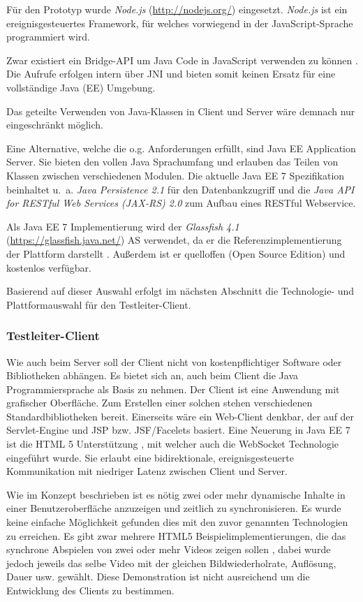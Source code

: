 Für den Prototyp wurde \emph{Node.js} (\url{http://nodejs.org/}) eingesetzt.
\emph{Node.js} ist ein ereignisgesteuertes Framework, für welches vorwiegend in der JavaScript-Sprache \cite[vgl.][]{Joyent.2014} programmiert wird.

Zwar existiert ein Bridge-\ac{API} um Java Code in JavaScript verwenden zu können .
Die Aufrufe erfolgen intern über \ac{JNI} und bieten somit keinen Ersatz für eine vollständige Java (EE) Umgebung. \cite[Vgl.][]{Ferner.2014}

Das geteilte Verwenden von Java-Klassen in Client und Server wäre demnach nur eingeschränkt möglich.

Eine Alternative, welche die o.g. Anforderungen erfüllt, sind Java EE Application Server.
Sie bieten den vollen Java Sprachumfang und erlauben das Teilen von Klassen zwischen verschiedenen Modulen.
Die aktuelle Java EE 7 Spezifikation beinhaltet u.~a. \emph{Java Persistence 2.1} für den Datenbankzugriff und die \emph{Java API for RESTful Web Services (JAX-RS) 2.0} zum Aufbau eines RESTful Webservice.
\cite[Vgl.][]{Oracle.2014}

Als Java EE 7 Implementierung wird der \emph{Glassfish 4.1} (\url{https://glassfish.java.net/})
\ac{AS} verwendet, da er die Referenzimplementierung der Plattform darstellt \cite[vgl.][14]{OracleCorporation.2013b}.
Außerdem ist er quelloffen (Open Source Edition) und kostenlos verfügbar.

Basierend auf dieser Auswahl erfolgt im nächsten Abschnitt die Technologie- und Plattformauswahl für den Testleiter-Client. 

\subsubsection{Testleiter-Client}
Wie auch beim Server soll der Client nicht von kostenpflichtiger Software oder Bibliotheken abhängen.
Es bietet sich an, auch beim Client die Java Programmiersprache als Basis zu nehmen.
Der Client ist eine Anwendung mit grafischer Oberfläche.
Zum Erstellen einer solchen stehen verschiedenen Standardbibliotheken bereit.
Einerseits wäre ein Web-Client denkbar, der auf der Servlet-Engine und \ac{JSP} bzw. \ac{JSF}/Facelets basiert.
Eine Neuerung in Java EE 7 ist die \ac{HTML} 5 Unterstützung \cite[vgl.][5]{OracleCorporation.2013b}, mit welcher auch die WebSocket Technologie eingeführt wurde.
Sie erlaubt eine bidirektionale, ereignisgesteuerte Kommunikation mit niedriger Latenz zwischen Client und Server.

Wie im Konzept beschrieben ist es nötig zwei oder mehr dynamische Inhalte in einer Benutzeroberfläche anzuzeigen und zeitlich zu synchronisieren.
Es wurde keine einfache Möglichkeit gefunden dies mit den zuvor genannten Technologien zu erreichen.
Es gibt zwar mehrere HTML5 Beispielimplementierungen, die das synchrone Abspielen von zwei oder mehr Videos zeigen sollen \cite{Waldron.2011,HTML5demos.2011}, dabei wurde jedoch jeweils das selbe Video mit der gleichen Bildwiederholrate, Auflösung, Dauer usw. gewählt.
Diese Demonstration ist nicht ausreichend um die Entwicklung des Clients zu bestimmen.

